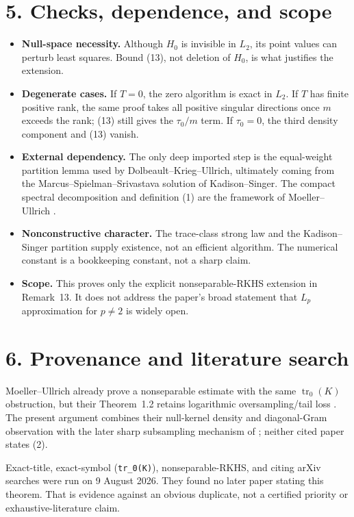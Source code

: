 \documentclass[10pt]{article}
\newcommand{\tr}{\operatorname{tr}}
\begin{document}
\section*{5. Checks, dependence, and scope}
\begin{itemize}[leftmargin=1.5em]
\item \textbf{Null-space necessity.}  Although $H_0$ is invisible in $L_2$,
its point values can perturb least squares.  Bound (13), not deletion of
$H_0$, is what justifies the extension.
\item \textbf{Degenerate cases.}  If $T=0$, the zero algorithm is exact in
$L_2$.  If $T$ has finite positive rank, the same proof takes all positive
singular directions once $m$ exceeds the rank; (13) still gives the
$\tau_0/m$ term.  If $\tau_0=0$, the third density component and (13) vanish.
\item \textbf{External dependency.}  The only deep imported step is the
equal-weight partition lemma used by Dolbeault--Krieg--Ullrich, ultimately
coming from the Marcus--Spielman--Srivastava solution of Kadison--Singer.
The compact spectral decomposition and definition (1) are the framework of
Moeller--Ullrich \cite[Section~7]{MU}.
\item \textbf{Nonconstructive character.}  The trace-class strong law and
the Kadison--Singer partition supply existence, not an efficient algorithm.
The numerical constant is a bookkeeping constant, not a sharp claim.
\item \textbf{Scope.}  This proves only the explicit nonseparable-RKHS
extension in Remark~13.  It does not address the paper's broad statement that
$L_p$ approximation for $p\neq2$ is widely open.
\end{itemize}

\section*{6. Provenance and literature search}
Moeller--Ullrich already prove a nonseparable estimate with the same
$\tr_0(K)$ obstruction, but their Theorem~1.2 retains logarithmic
oversampling/tail loss \cite[Theorem~1.2 and Section~7]{MU}.  The present
argument combines their null-kernel density and diagonal-Gram observation
with the later sharp subsampling mechanism of \cite{DKU}; neither cited
paper states (2).

Exact-title, exact-symbol (\texttt{tr\_0(K)}), nonseparable-RKHS, and citing
arXiv searches were run on 9 August 2026.  They found no later paper stating
this theorem.  That is evidence against an obvious duplicate, not a certified
priority or exhaustive-literature claim.
\end{document}
